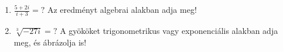 \documentclass[11pt]{scrartcl}
\begin{document}
\begin{enumerate}
	\item \(\displaystyle
	      \frac{5 + 2i}{i + 3} = ?
	      \) Az eredményt algebrai alakban adja meg!

	\item $\sqrt[3]{-27i} = ?$ A gyököket trigonometrikus vagy exponenciális
	      alakban adja meg, és ábrázolja is!
\end{enumerate}
\end{document}
